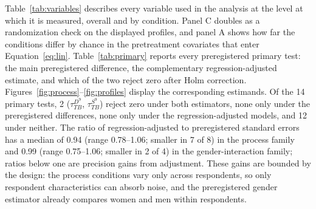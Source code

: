 \documentclass[11pt]{article}\usepackage[]{graphicx}\usepackage[]{xcolor}
\begin{document}
Table~\ref{tab:variables} describes every variable used in the analysis at the level at which it is measured, overall and by condition. Panel C doubles as a randomization check on the displayed profiles, and panel A shows how far the conditions differ by chance in the pretreatment covariates that enter Equation~\eqref{eq:lin}. Table~\ref{tab:primary} reports every preregistered primary test: the main preregistered difference, the complementary regression-adjusted estimate, and which of the two reject zero after Holm correction. Figures~\ref{fig:process}--\ref{fig:profiles} display the corresponding estimands. Of the 14 primary tests, 2 ($\tau^{D^{9}}_{TB}$, $\tau^{S^{9}}_{TB}$) reject zero under both estimators, none only under the preregistered differences, none only under the regression-adjusted models, and 12 under neither. The ratio of regression-adjusted to preregistered standard errors has a median of 0.94 (range 0.78--1.06; smaller in 7 of 8) in the process family and 0.99 (range 0.75--1.06; smaller in 2 of 4) in the gender-interaction family; ratios below one are precision gains from adjustment. These gains are bounded by the design: the process conditions vary only across respondents, so only respondent characteristics can absorb noise, and the preregistered gender estimator already compares women and men within respondents.
\end{document}

